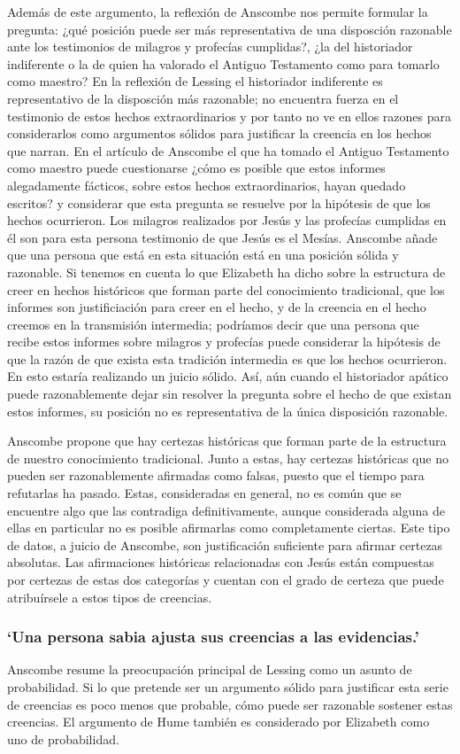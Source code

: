 Además de este argumento, la reflexión de Anscombe nos permite formular la pregunta: ¿qué posición puede ser más representativa de una disposción razonable ante los testimonios de milagros y profecías cumplidas?, ¿la del historiador indiferente o la de quien ha valorado el Antiguo Testamento como para tomarlo como maestro? En la reflexión de Lessing el historiador indiferente es representativo de la disposción más razonable; no encuentra fuerza en el testimonio de estos hechos extraordinarios y por tanto no ve en ellos razones para considerarlos como argumentos sólidos para justificar la creencia en los hechos que narran. En el artículo de Anscombe el que ha tomado el Antiguo Testamento como maestro puede cuestionarse ¿cómo es posible que estos informes alegadamente fácticos, sobre estos hechos extraordinarios, hayan quedado escritos? y considerar que esta pregunta se resuelve por la hipótesis de que los hechos ocurrieron. Los milagros realizados por Jesús y las profecías cumplidas en él son para esta persona testimonio de que Jesús es el Mesías. Anscombe añade que una persona que está en esta situación está en una posición sólida y razonable. Si tenemos en cuenta lo que Elizabeth ha dicho sobre la estructura de creer en hechos históricos que forman parte del conocimiento tradicional, que los informes son justificiación para creer en el hecho, y de la creencia en el hecho creemos en la transmisión intermedia; podríamos decir que una persona que recibe estos informes sobre milagros y profecías puede considerar la hipótesis de que la razón de que exista esta tradición intermedia es que los hechos ocurrieron. En esto estaría realizando un juicio sólido. Así, aún cuando el historiador apático puede razonablemente dejar sin resolver la pregunta sobre el hecho de que existan estos informes, su posición no es representativa de la única disposición razonable.

Anscombe propone que hay certezas históricas que forman parte de la estructura de nuestro conocimiento tradicional. Junto a estas, hay certezas históricas que no pueden ser razonablemente afirmadas como falsas, puesto que el tiempo para refutarlas ha pasado. Estas, consideradas en general, no es común que se encuentre algo que las contradiga definitivamente, aunque considerada alguna de ellas en particular no es posible afirmarlas como completamente ciertas. Este tipo de datos, a juicio de Anscombe, son justificación suficiente para afirmar certezas absolutas. Las afirmaciones históricas relacionadas con Jesús están compuestas por certezas de estas dos categorías y cuentan con el grado de certeza que puede atribuírsele a estos tipos de creencias.

\subsubsection{\enquote*{Una persona sabia ajusta sus creencias a las evidencias.}}

Anscombe resume la preocupación principal de Lessing como un asunto de probabilidad. Si lo que pretende ser un argumento sólido para justificar esta serie de creencias es poco menos que probable, cómo puede ser razonable sostener estas creencias. El argumento de Hume también es considerado por Elizabeth como uno de probabilidad.
